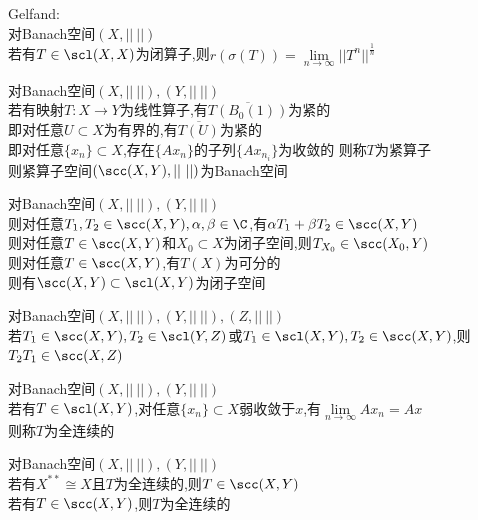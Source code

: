 \begin{dingli}
Gelfand:\\
对Banach空间$(X,||\ ||)$\\
若有$T\in\scl(X,X)$为闭算子,则$r(\sigma(T))=\lim\limits_{n\to\infty}||T^n||^{\frac{1}{n}}$
\end{dingli}

\begin{dingyi}
对Banach空间$(X,||\ ||),(Y,||\ ||)$\\
若有映射$T:X\to Y$为线性算子,有$\overline{T(B_{0}(1))}$为紧的\\
即对任意$U\subset X$为有界的,有$\overline{T(U)}$为紧的\\
即对任意$\{x_n\}\subset X$,存在$\{Ax_n\}$的子列$\{Ax_{n_i}\}$为收敛的
则称$T$为紧算子\\
则紧算子空间$(\scc(X,Y),||\ ||)$为Banach空间
\end{dingyi}

\begin{dingli}
对Banach空间$(X,||\ ||),(Y,||\ ||)$\\
则对任意$T_1,T_2\in\scc(X,Y),\alpha,\beta\in\C$,有$\alpha T_1+\beta T_2\in\scc(X,Y)$\\
则对任意$T\in\scc(X,Y)$和$X_0\subset X$为闭子空间,则$T_{X_0}\in\scc(X_0,Y)$\\
则对任意$T\in\scc(X,Y)$,有$T(X)$为可分的\\
则有$\scc(X,Y)\subset\scl(X,Y)$为闭子空间
\end{dingli}

\begin{dingli}
对Banach空间$(X,||\ ||),(Y,||\ ||),(Z,||\ ||)$\\
若$T_1\in\scc(X,Y),T_2\in\scl(Y,Z)$或$T_1\in\scl(X,Y),T_2\in\scc(X,Y)$,则$T_2T_1\in\scc(X,Z)$
\end{dingli}

\begin{dingyi}
对Banach空间$(X,||\ ||),(Y,||\ ||)$\\
若有$T\in\scl(X,Y)$,对任意$\{x_n\}\subset X$弱收敛于$x$,有$\lim\limits_{n\to\infty}Ax_n=Ax$\\
则称$T$为全连续的
\end{dingyi}

\begin{dingli}
对Banach空间$(X,||\ ||),(Y,||\ ||)$\\
若有$X^{**}\cong X$且$T$为全连续的,则$T\in\scc(X,Y)$\\
若有$T\in\scc(X,Y)$,则$T$为全连续的
\end{dingli}

